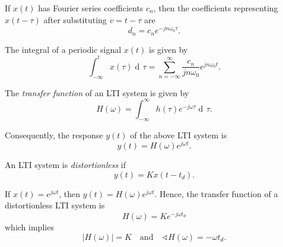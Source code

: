 \documentclass[10pt,letterpaper]{article}
\DeclareMathOperator{\di}{d\!} %
\newcommand{\sumi}[1][1]{ \sum_{n={#1}}^{\infty} } %
\newcommand{\abs}[1]{\left| #1 \right|} %
\newcommand{\xabs}{ \abs{x(t)}^2 }
\newcommand{\Iint}{ \int_{-\infty}^{\infty} }
\newcommand{\Uint}{ \int\displaylimits_{<T>} }
\newcommand{\omegaE}{ e^{jn\omega_0t} }
\begin{document}
\begin{multicols*}{3}
If $x(t)$ has Fourier series coefficients $c_n$, then the coefficients representing $x(t-\tau)$ after substituting $v = t-\tau$ are
\[ d_n = c_n e^{-jn\omega_0\tau}. \]


The integral of a periodic signal $x(t)$ is given by
\[ \int_{-\infty}^t x(\tau) \di\tau = \sumi[-\infty] \dfrac{c_n}{jn\omega_0} \omegaE. \]

The \textit{transfer function} of an LTI system is given by
\[ H(\omega) = \Iint h(\tau)e^{-j\omega\tau} \di\tau. \]

Consequently, the response $y(t)$ of the above LTI system is
\[ y(t) = H(\omega)e^{j\omega t}. \]

An LTI system is \textit{distortionless} if
\[ y(t) = Kx(t-t_d). \]

If $x(t) = e^{j\omega t}$, then $y(t) = H(\omega)e^{j\omega t}$. Hence, the transfer function of a distortionless LTI system is
\[ H(\omega) = Ke^{-j\omega t_d} \]
which implies
\[ \abs{H(\omega)} = K \quad \text{and} \quad \sphericalangle H(\omega) = -\omega t_d. \]

\end{multicols*}
\end{document}
